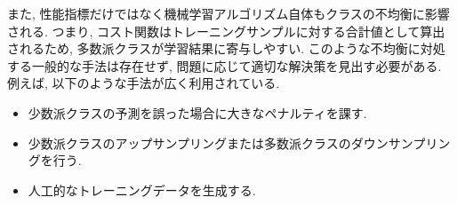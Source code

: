 \documentclass[uplatex]{jsarticle}
\theoremstyle{definition}
\numberwithin{equation}{section}
\begin{document}
また, 性能指標だけではなく機械学習アルゴリズム自体もクラスの不均衡に影響される.
つまり, コスト関数はトレーニングサンプルに対する合計値として算出されるため, 多数派クラスが学習結果に寄与しやすい.
このような不均衡に対処する一般的な手法は存在せず, 問題に応じて適切な解決策を見出す必要がある.
例えば, 以下のような手法が広く利用されている.
\begin{itemize}
    \item
    少数派クラスの予測を誤った場合に大きなペナルティを課す.

    \item
    少数派クラスのアップサンプリングまたは多数派クラスのダウンサンプリングを行う.

    \item
    人工的なトレーニングデータを生成する.
\end{itemize}
\end{document}
